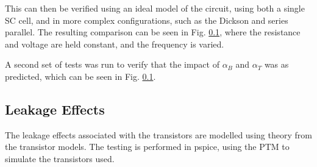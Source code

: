 \documentclass[conference]{IEEEtran}
\begin{document}
	This can then be verified using an ideal model of the circuit, using both a single SC cell, and in more complex configurations, such as the Dickson and series parallel. The resulting comparison can be seen in Fig. \ref{}, where the resistance and voltage are held constant, and the frequency is varied.
	
	A second set of tests was run to verify that the impact of $\alpha_B$ and $\alpha_T$ was as predicted, which can be seen in Fig. \ref{}.
	
	\subsection{Leakage Effects}
	The leakage effects associated with the transistors are modelled using theory from the \cite{} transistor models. The testing is performed in pspice, using the PTM to simulate the transistors used. 
	
	
\end{document}

